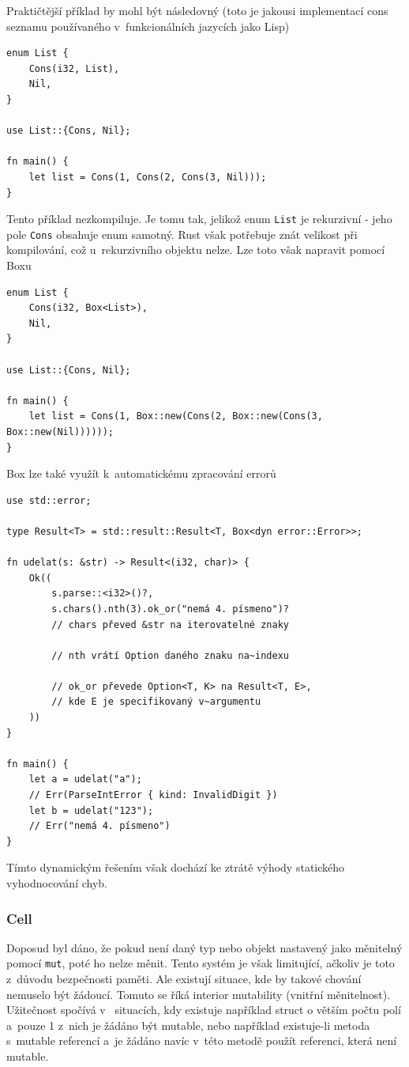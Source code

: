 \documentclass[a4paper, 12pt]{article} %
\newcommand{\rust}[1]{\texttt{#1}}
\begin{document}
			Praktičtější příklad by mohl být následovný (toto je jakousi implementací cons seznamu používaného v~funkcionálních jazycích jako Lisp)
			\begin{verbatim}
enum List {
	Cons(i32, List),
	Nil,
}

use List::{Cons, Nil};

fn main() {
	let list = Cons(1, Cons(2, Cons(3, Nil)));
}
			\end{verbatim}
			
			Tento příklad nezkompiluje. Je tomu tak, jelikož enum \rust{List} je rekurzivní - jeho pole \rust{Cons} obsahuje enum samotný. Rust však potřebuje znát velikost při kompilování, což u~rekurzivního objektu nelze. Lze toto však napravit pomocí Boxu
			\begin{verbatim}
enum List {
	Cons(i32, Box<List>),
	Nil,
}

use List::{Cons, Nil};

fn main() {
	let list = Cons(1, Box::new(Cons(2, Box::new(Cons(3, Box::new(Nil))))));
}
			\end{verbatim}
			\cite{box}
			
			Box lze také využít k~automatickému zpracování errorů
			\begin{verbatim}
use std::error;

type Result<T> = std::result::Result<T, Box<dyn error::Error>>;

fn udelat(s: &str) -> Result<(i32, char)> {
	Ok((
		s.parse::<i32>()?,
		s.chars().nth(3).ok_or("nemá 4. písmeno")?
		// chars převed &str na iterovatelné znaky

		// nth vrátí Option daného znaku na~indexu
		
		// ok_or převede Option<T, K> na Result<T, E>,
		// kde E je specifikovaný v~argumentu
	))
}

fn main() {
	let a = udelat("a");
	// Err(ParseIntError { kind: InvalidDigit })
	let b = udelat("123");
	// Err("nemá 4. písmeno")
}
			\end{verbatim}
			
			Tímto dynamickým řešením však dochází ke ztrátě výhody statického vyhodnocování chyb.\cite{box_err}
			
		\subsubsection*{Cell}
			Doposud byl dáno, že pokud není daný typ nebo objekt nastavený jako měnitelný pomocí \rust{mut}, poté ho nelze měnit. Tento systém je však limitující, ačkoliv je toto z~důvodu bezpečnosti paměti. Ale existují situace, kde by takové chování nemuselo být žádoucí. Tomuto se říká interior mutability (vnitřní měnitelnost). Užitečnost spočívá v~ situacích, kdy existuje například struct o větším počtu polí a~pouze 1 z~nich je žádáno být mutable, nebo například existuje-li metoda s~mutable referencí a~je žádáno navíc v~této metodě použít referenci, která není mutable.
			
\end{document}

